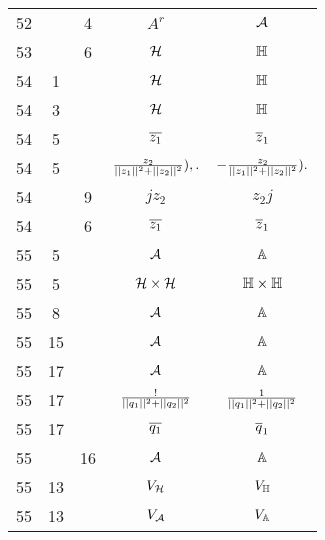 \documentclass[a4paper,11pt]{article}
\begin{document}
\begin{center}
\begin{tabular}{|c|c|c|c|c|}
    52  & &  4 & $A^{ r }$ & $\mathcal{A}$ \\
    53  & &  6 & $\mathcal{H}$ & $\mathbb{H}$ \\
    54  &  1 & & $\mathcal{H}$ & $\mathbb{H}$ \\
    54  &  3 & & $\mathcal{H}$ & $\mathbb{H}$ \\
    54  &  5 & & $\overline{ z_{ 1 } }$ & $\overline{ z }_{ 1 }$ \\
    54  &  5 & & $\frac{ z_{ 2 } }{ || z_{ 1 } ||^{ 2 } + || z_{ 2 } ||^{ 2 } } ),.$
           & $-\frac{ z_{ 2 } }{ || z_{ 1 } ||^{ 2 } + || z_{ 2 } ||^{ 2 } } ).$ \\
    54  & &  9 & $j z_{ 2 }$ & $z_{ 2 } j$ \\
    54  & &  6 & $\overline{ z_{ 1 } }$ & $\overline{ z }_{ 1 }$ \\
    55  &  5 & & $\mathcal{A}$ & $\mathbb{A}$ \\
    55  &  5 & & $\mathcal{H} \times \mathcal{H}$ & $\mathbb{H} \times \mathbb{H}$ \\
    55  &  8 & & $\mathcal{A}$ & $\mathbb{A}$ \\
    55  & 15 & & $\mathcal{A}$ & $\mathbb{A}$ \\
    55  & 17 & & $\mathcal{A}$ & $\mathbb{A}$ \\
    55  & 17 & & $\frac{ ! }{ || q_{ 1 } ||^{ 2 } + || q_{ 2 } ||^{ 2 } }$
           & $\frac{ 1 }{ || q_{ 1 } ||^{ 2 } + || q_{ 2 } ||^{ 2 } }$ \\
    55  & 17 & & $\overline{ q_{ 1 } }$ & $\overline{ q }_{ 1 }$ \\
    55  & & 16 & $\mathcal{A}$ & $\mathbb{A}$ \\
    55  & 13 & & $V_{ \mathcal{H} }$ & $V_{ \mathbb{H} }$ \\
    55  & 13 & & $V_{ \mathcal{A} }$ & $V_{ \mathbb{A} }$ \\
    \hline
  \end{tabular}


\end{center}
\end{document}
